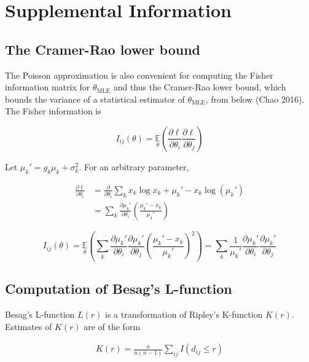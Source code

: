 \documentclass{ucetd}
\begin{document}
\section{Supplemental Information}


\subsection{The Cramer-Rao lower bound}

The Poisson approximation is also convenient for computing the Fisher information matrix for $\theta_{\mathrm{MLE}}$ and thus the Cramer-Rao lower bound, which bounds the variance of a statistical estimator of $\theta_{\mathrm{MLE}}$, from below (Chao 2016). The Fisher information is

\begin{equation}
I_{ij}(\theta) = \underset{\theta}{\mathbb{E}}\left(\frac{\partial \ell}{\partial\theta_{i}}\frac{\partial\ell}{\partial\theta_{j}}\right) 
\end{equation}

Let $\mu_{k}' = g_{k}\mu_{k} + \sigma_{k}^{2}$. For an arbitrary parameter,

\begin{align*}
\frac{\partial \ell}{\partial \theta_{i}} &= \frac{\partial}{\partial \theta_{i}} \sum_{k}  x_{k}\log x_{k} + \mu_{k}' - x_{k}\log\left(\mu_{k}'\right)\\
&= \sum_{k} \frac{\partial \mu_{k}'}{\partial\theta_{i}} \left(\frac{\mu_{k}'-x_{k}}{\mu_{k}'}\right)
\end{align*}

\begin{equation*}
I_{ij}(\theta) = \underset{\theta}{\mathbb{E}}\left(\sum_{k}\frac{\partial \mu_{k}'}{\partial\theta_{i}}\frac{\partial \mu_{k}'}{\partial\theta_{j}} \left(\frac{\mu_{k}'-x_{k}}{\mu_{k}'}\right)^{2}\right) = \sum_{k}\frac{1}{\mu_{k}'}\frac{\partial \mu_{k}'}{\partial\theta_{i}}\frac{\partial \mu_{k}'}{\partial\theta_{j}}
\end{equation*}


\subsection{Computation of Besag's L-function}

Besag's L-function $L(r)$ is a transformation of Ripley's K-function $K(r)$. Estimates of $K(r)$ are of the form 

\begin{align*}
K(r) = \frac{a}{n(n-1)}\sum_{ij} I(d_{ij}\leq r)
\end{align*}
\end{document}
